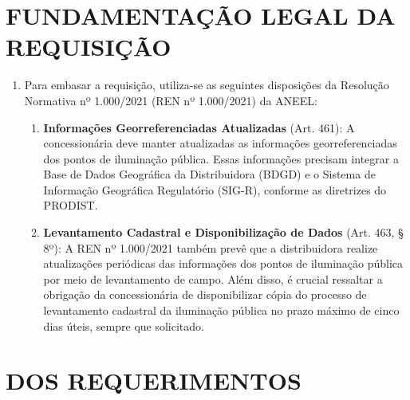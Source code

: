 \documentclass[11pt,a4paper]{article}
\begin{document}
\section{FUNDAMENTAÇÃO LEGAL DA REQUISIÇÃO}

\begin{enumerate}[resume]
\item
  Para embasar a requisição, utiliza-se as seguintes disposições da Resolução Normativa nº 1.000/2021 (REN nº 1.000/2021) da ANEEL:
  \begin{enumerate}
  \item
    \textbf{Informações Georreferenciadas Atualizadas} (Art. 461): A concessionária deve manter atualizadas as informações georreferenciadas dos pontos de iluminação pública. Essas informações precisam integrar a Base de Dados Geográfica da Distribuidora (BDGD) e o Sistema de Informação Geográfica Regulatório (SIG-R), conforme as diretrizes do PRODIST.
  \item 
  \textbf{Levantamento Cadastral e Disponibilização de Dados} (Art. 463, § 8º): A REN nº 1.000/2021 também prevê que a distribuidora realize atualizações periódicas das informações dos pontos de iluminação pública por meio de levantamento de campo. Além disso, é crucial ressaltar a obrigação da concessionária de disponibilizar cópia do processo de levantamento cadastral da iluminação pública no prazo máximo de cinco dias úteis, sempre que solicitado.
  \end{enumerate}
\end{enumerate}

\section{DOS REQUERIMENTOS}
\end{document}
